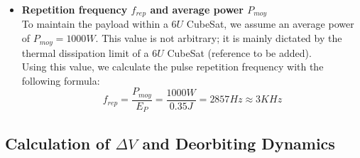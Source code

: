 \documentclass[11pt,a4paper]{article}
\begin{document}
\begin{itemize}
    \item \textbf{Repetition frequency $f_{rep}$ and average power $P_{moy}$}\\
    To maintain the payload within a $6U$ CubeSat, we assume an average power of $P_{moy} = 1000 W$. This value is not arbitrary; it is mainly dictated by the thermal dissipation limit of a $6U$ CubeSat (reference to be added).\\
    Using this value, we calculate the pulse repetition frequency with the following formula: \\
    \begin{equation}
        \boxed{f_{rep} = \frac{P_{moy}}{E_{P}} = \frac{1000W}{0.35 J}  = 2857 Hz \approx 3KHz}
    \end{equation}

\end{itemize}

\subsection{Calculation of $\Delta V$ and Deorbiting Dynamics}
\end{document}
